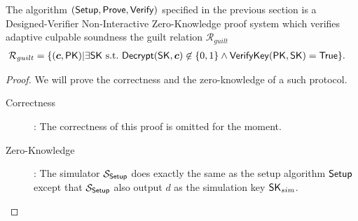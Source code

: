 \begin{theorem}
  The algorithm $({\mathsf{Setup}}, {\mathsf{Prove}}, {\mathsf{Verify}})$ specified in the previous section is a Designed-Verifier Non-Interactive Zero-Knowledge proof system
  which verifies adaptive culpable soundness \wrt the guilt relation $\mathcal{R}_{guilt}$
  \begin{align*}
    \mathcal{R}_{guilt} &= \{(\vec{c}, \PK) | \exists \SK~\st~\Dec(\SK, \vec{c}) \not \in \{0,1\}  \wedge {\mathsf{VerifyKey}}(\PK, \SK)  = \True\}.
  \end{align*}
\end{theorem}

\begin{proof}
  We will prove the correctness and the zero-knowledge of a such protocol.
  \begin{description}
  \item[\textsf{Correctness}]: The correctness of this proof is omitted for the moment.
  \item[\textsf{Zero-Knowledge}]:
    The simulator $\mathcal{S}_{{\mathsf{Setup}}}$ does exactly the same as the setup algorithm ${\mathsf{Setup}}$ except that $\mathcal{S}_{{\mathsf{Setup}}}$ also output $d$ as the simulation key $\mathsf{SK}_{sim}$.


\end{description}
\end{proof}

